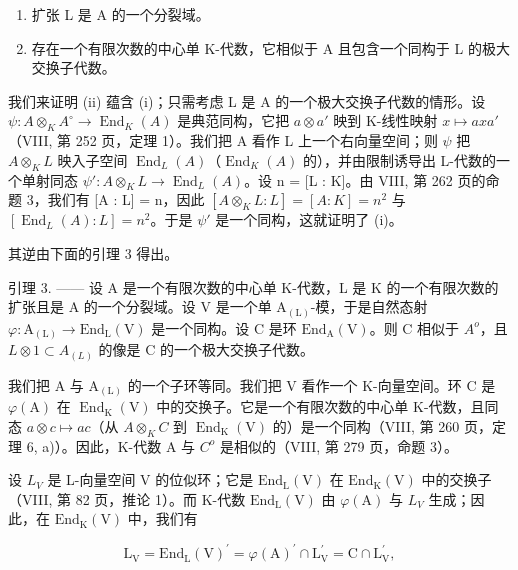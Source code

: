 \begin{enumerate}
\def\labelenumi{(\roman{enumi})}
\item
  扩张 L 是 A 的一个分裂域。
\item
  存在一个有限次数的中心单 K-代数，它相似于 A 且包含一个同构于 L 的极大交换子代数。
\end{enumerate}

我们来证明 (ii) 蕴含 (i)；只需考虑 L 是 A 的一个极大交换子代数的情形。设 \(\psi: A \otimes_{K} A^{\circ} \to \operatorname{End}_{K}(A)\) 是典范同构，它把 \(a \otimes a'\) 映到 K-线性映射 \(x \mapsto axa'\)（VIII, 第 252 页，定理 1）。我们把 A 看作 L 上一个右向量空间；则 \(\psi\) 把 \(A \otimes_{K} L\) 映入子空间 \(\operatorname{End}_{L}(A)\)（\(\operatorname{End}_{K}(A)\) 的），并由限制诱导出 L-代数的一个单射同态 \(\psi': A \otimes_{K} L \to \operatorname{End}_{L}(A)\)。设 n = {[}L : K{]}。由 VIII, 第 262 页的命题 3，我们有 {[}A : L{]} = n，因此 \([A \otimes_{K} L : L] = [A : K] = n^{2}\) 与 \([\operatorname{End}_{L}(A) : L] = n^{2}\)。于是 \(\psi'\) 是一个同构，这就证明了 (i)。

其逆由下面的引理 3 得出。

引理 3. —— 设 A 是一个有限次数的中心单 K-代数，L 是 K 的一个有限次数的扩张且是 A 的一个分裂域。设 V 是一个单 \(\mathrm{A}_{(\mathrm{L})}\)-模，于是自然态射 \(\varphi: \mathrm{A}_{(\mathrm{L})} \to \mathrm{End}_{\mathrm{L}}(\mathrm{V})\) 是一个同构。设 C 是环 \(\mathrm{End}_{\mathrm{A}}(\mathrm{V})\)。则 C 相似于 \(A^{o}\)，且 \(L \otimes 1 \subset A_{(L)}\) 的像是 C 的一个极大交换子代数。

我们把 A 与 \(\mathrm{A}_{(\mathrm{L})}\) 的一个子环等同。我们把 V 看作一个 K-向量空间。环 C 是 \(\varphi(\mathrm{A})\) 在 \(\operatorname{End}_{\mathrm{K}}(\mathrm{V})\) 中的交换子。它是一个有限次数的中心单 K-代数，且同态 \(a \otimes c \mapsto ac\)（从 \(A \otimes_{K} C\) 到 \(\operatorname{End}_{\mathrm{K}}(\mathrm{V})\) 的）是一个同构（VIII, 第 260 页，定理 6, a)）。因此，K-代数 A 与 \(C^{o}\) 是相似的（VIII, 第 279 页，命题 3）。

设 \(L_{V}\) 是 L-向量空间 V 的位似环；它是 \(\mathrm{End}_{\mathrm{L}}(\mathrm{V})\) 在 \(\mathrm{End}_{\mathrm{K}}(\mathrm{V})\) 中的交换子（VIII, 第 82 页，推论 1）。而 K-代数 \(\mathrm{End}_{\mathrm{L}}(\mathrm{V})\) 由 \(\varphi(\mathrm{A})\) 与 \(L_{V}\) 生成；因此，在 \(\mathrm{End}_{\mathrm{K}}(\mathrm{V})\) 中，我们有

\[
\mathrm{L} _ {\mathrm{V}} = \mathrm{End} _ {\mathrm{L}} (\mathrm{V}) ^ {\prime} = \varphi (\mathrm{A}) ^ {\prime} \cap \mathrm{L} _ {\mathrm{V}} ^ {\prime} = \mathrm{C} \cap \mathrm{L} _ {\mathrm{V}} ^ {\prime},
\]


